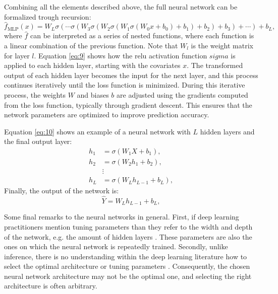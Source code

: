 Combining all the elements described above, the full neural network can be formalized trough recursion:
\begin{equation}
\hat{f}_{\text{MLP}}(x) = W_L \sigma \left( \cdots \sigma \left( W_3 \sigma \left( W_2 \sigma \left( W_1 \sigma \left( W_0 x + b_0 \right) + b_1 \right) + b_2 \right) + b_3 \right) + \cdots \right) + b_L,
\label{eq:9}
\end{equation}
where $\hat{f}$ can be interpreted as a series of nested functions, where each function is a linear combination of the previous function.
Note that $W_l$ is the weight matrix for layer $l$.
Equation \ref{eq:9} shows how the \ac{relu} activation function $sigma$ is applied to each hidden layer, starting with the covariates $x$.
The transformed output of each hidden layer becomes the input for the next layer, and this process continues iteratively until the loss function is minimized.
During this iterative process, the weights $W$ and biases $b$ are adjusted using the gradients computed from the loss function, typically through gradient descent.
This ensures that the network parameters are optimized to improve prediction accuracy.

Equation \ref{eq:10} shows an example of a neural network with $L$ hidden layers and the final output layer:
\begin{align}
h_1 &= \sigma(W_1 X + b_1), \nonumber \\
h_2 &= \sigma(W_2 h_1 + b_2), \nonumber  \\
&\vdots \nonumber \\
h_L &= \sigma(W_L h_{L-1} + b_L),
\label{eq:10}
\end{align}
Finally, the output of the network is:
\begin{equation}
\hat{Y} = W_L h_{L-1} + b_L, \nonumber
\end{equation}



Some final remarks to the neural networks in general.
First, if deep learning practitioners mention tuning parameters than they refer to the width and depth of the network, e.g. the amount of hidden layers \citep{farrellDeepNeuralNetworks2021}.
These parameters are also the ones on which the neural network is repeatedly trained.
Secondly, unlike inference, there is no understanding within the deep learning literature how to select the optimal architecture or tuning parameters \citep[see][]{10.1214/19-AOS1875,telgarsky2016benefits}.
Consequently, the chosen neural network architecture may not be the optimal one, and selecting the right architecture is often arbitrary.
